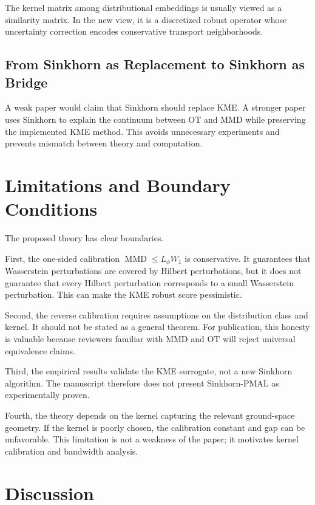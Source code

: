 \documentclass[10pt,journal]{IEEEtran}
\DeclareMathOperator{\MMD}{MMD}
\begin{document}
The kernel matrix among distributional embeddings is usually viewed as a similarity matrix. In the new view, it is a discretized robust operator whose uncertainty correction encodes conservative transport neighborhoods.

\subsection{From Sinkhorn as Replacement to Sinkhorn as Bridge}

A weak paper would claim that Sinkhorn should replace KME. A stronger paper uses Sinkhorn to explain the continuum between OT and MMD while preserving the implemented KME method. This avoids unnecessary experiments and prevents mismatch between theory and computation.

\fi

\section{Limitations and Boundary Conditions}
\label{sec:limitations}

The proposed theory has clear boundaries.

First, the one-sided calibration $\MMD\le L_\phi W_1$ is conservative. It guarantees that Wasserstein perturbations are covered by Hilbert perturbations, but it does not guarantee that every Hilbert perturbation corresponds to a small Wasserstein perturbation. This can make the KME robust score pessimistic.

Second, the reverse calibration requires assumptions on the distribution class and kernel. It should not be stated as a general theorem. For publication, this honesty is valuable because reviewers familiar with MMD and OT will reject universal equivalence claims.

Third, the empirical results validate the KME surrogate, not a new Sinkhorn algorithm. The manuscript therefore does not present Sinkhorn-PMAL as experimentally proven.

Fourth, the theory depends on the kernel capturing the relevant ground-space geometry. If the kernel is poorly chosen, the calibration constant and gap can be unfavorable. This limitation is not a weakness of the paper; it motivates kernel calibration and bandwidth analysis.


\section{Discussion}
\label{sec:discussion}
\end{document}
